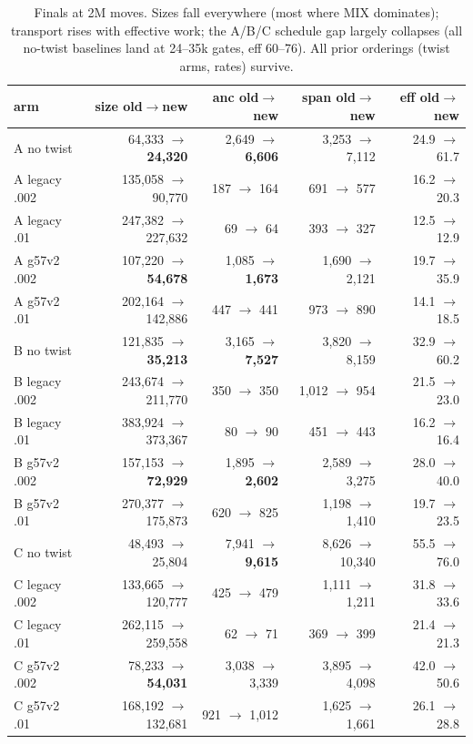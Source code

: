 \documentclass[11pt]{article}
\begin{document}
\begin{table}[h]\centering\small
\begin{tabular}{lrrrr}
\toprule
arm & size old$\to$new & anc old$\to$new & span old$\to$new & eff old$\to$new \\
\midrule
A no twist & 64{,}333 $\to$ \textbf{24{,}320} & 2{,}649 $\to$ \textbf{6{,}606} & 3{,}253 $\to$ 7{,}112 & 24.9 $\to$ 61.7 \\
A legacy .002 & 135{,}058 $\to$ 90{,}770 & 187 $\to$ 164 & 691 $\to$ 577 & 16.2 $\to$ 20.3 \\
A legacy .01 & 247{,}382 $\to$ 227{,}632 & 69 $\to$ 64 & 393 $\to$ 327 & 12.5 $\to$ 12.9 \\
A g57v2 .002 & 107{,}220 $\to$ \textbf{54{,}678} & 1{,}085 $\to$ \textbf{1{,}673} & 1{,}690 $\to$ 2{,}121 & 19.7 $\to$ 35.9 \\
A g57v2 .01 & 202{,}164 $\to$ 142{,}886 & 447 $\to$ 441 & 973 $\to$ 890 & 14.1 $\to$ 18.5 \\
B no twist & 121{,}835 $\to$ \textbf{35{,}213} & 3{,}165 $\to$ \textbf{7{,}527} & 3{,}820 $\to$ 8{,}159 & 32.9 $\to$ 60.2 \\
B legacy .002 & 243{,}674 $\to$ 211{,}770 & 350 $\to$ 350 & 1{,}012 $\to$ 954 & 21.5 $\to$ 23.0 \\
B legacy .01 & 383{,}924 $\to$ 373{,}367 & 80 $\to$ 90 & 451 $\to$ 443 & 16.2 $\to$ 16.4 \\
B g57v2 .002 & 157{,}153 $\to$ \textbf{72{,}929} & 1{,}895 $\to$ \textbf{2{,}602} & 2{,}589 $\to$ 3{,}275 & 28.0 $\to$ 40.0 \\
B g57v2 .01 & 270{,}377 $\to$ 175{,}873 & 620 $\to$ 825 & 1{,}198 $\to$ 1{,}410 & 19.7 $\to$ 23.5 \\
C no twist & 48{,}493 $\to$ 25{,}804 & 7{,}941 $\to$ \textbf{9{,}615} & 8{,}626 $\to$ 10{,}340 & 55.5 $\to$ 76.0 \\
C legacy .002 & 133{,}665 $\to$ 120{,}777 & 425 $\to$ 479 & 1{,}111 $\to$ 1{,}211 & 31.8 $\to$ 33.6 \\
C legacy .01 & 262{,}115 $\to$ 259{,}558 & 62 $\to$ 71 & 369 $\to$ 399 & 21.4 $\to$ 21.3 \\
C g57v2 .002 & 78{,}233 $\to$ \textbf{54{,}031} & 3{,}038 $\to$ 3{,}339 & 3{,}895 $\to$ 4{,}098 & 42.0 $\to$ 50.6 \\
C g57v2 .01 & 168{,}192 $\to$ 132{,}681 & 921 $\to$ 1{,}012 & 1{,}625 $\to$ 1{,}661 & 26.1 $\to$ 28.8 \\
\bottomrule
\end{tabular}
\caption{Finals at 2M moves. Sizes fall everywhere (most where MIX
dominates); transport rises with effective work; the A/B/C schedule gap
largely collapses (all no-twist baselines land at 24--35k gates, eff
60--76). All prior orderings (twist arms, rates) survive.}
\end{table}
\end{document}
